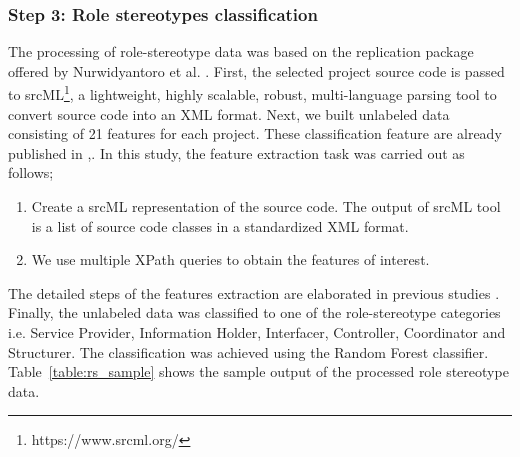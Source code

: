 \documentclass[AMA,Times1COL]{WileyNJDv5} %
\begin{document}
	\subsubsection*{Step 3: Role stereotypes classification}
	The processing of role-stereotype data was based on the replication package offered by Nurwidyantoro et al. \cite{nurwidyantoro2019automated, ho2022role}. First, the selected project source code
	is passed to srcML\footnote{https://www.srcml.org/}, a lightweight, highly scalable, robust, multi-language parsing tool to convert source code into an XML format. Next,
	we built unlabeled data consisting of 21 features for each project. These classification feature are already published in \cite{nurwidyantoro2019automated},\cite{ho2022role}. In this study, the feature extraction task was carried out as follows;
	\begin{enumerate}
		\item Create a srcML representation of the source code. The output of srcML tool is a list of source
		code classes in a standardized XML format.
		\item We use multiple XPath queries to obtain the features of interest.
	\end{enumerate}
	The detailed steps of the features extraction are elaborated in previous studies \cite{nurwidyantoro2019automated, ho2022role}. Finally, the unlabeled data was classified to one of the role-stereotype categories i.e.
	Service Provider, Information Holder, Interfacer, Controller, Coordinator and Structurer. The classification was achieved using the Random Forest classifier\cite{nurwidyantoro2019automated, ho2022role}. Table~\ref{table:rs_sample} shows the sample output of the processed role stereotype data.
\end{document}
